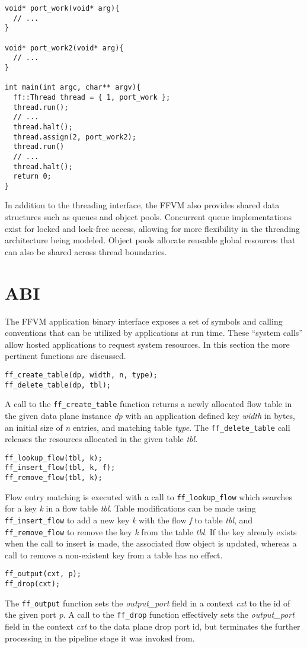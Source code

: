 \begin{lstlisting}
void* port_work(void* arg){
  // ...
}

void* port_work2(void* arg){
  // ...
}

int main(int argc, char** argv){
  ff::Thread thread = { 1, port_work };
  thread.run();
  // ...
  thread.halt();
  thread.assign(2, port_work2);
  thread.run()
  // ...
  thread.halt();
  return 0;
}
\end{lstlisting}

In addition to the threading interface, the FFVM also provides shared data
structures such as queues and object pools. Concurrent queue implementations
exist for locked and lock-free access, allowing for more flexibility in the
threading architecture being modeled. Object pools allocate reusable global
resources that can also be shared across thread boundaries.

\section{ABI}
\label{vm:abi}
The FFVM application binary interface exposes a set of symbols and calling
conventions that can be utilized by applications at run time. These ``system
calls'' allow hosted applications to request system resources. In this section
the more pertinent functions are discussed.

\begin{lstlisting}
ff_create_table(dp, width, n, type);
ff_delete_table(dp, tbl);
\end{lstlisting}

A call to the \texttt{ff\_create\_table} function returns a newly allocated
flow table in the given data plane instance \emph{dp} with an application
defined key \emph{width} in bytes, an initial size of \emph{n} entries, and
matching table \emph{type}. The \texttt{ff\_delete\_table} call releases the
resources allocated in the given table \emph{tbl}.

\begin{lstlisting}
ff_lookup_flow(tbl, k);
ff_insert_flow(tbl, k, f);
ff_remove_flow(tbl, k);
\end{lstlisting}

Flow entry matching is executed with a call to \texttt{ff\_lookup\_flow} which
searches for a key \emph{k} in a flow table \emph{tbl}. Table modifications can
be made using \texttt{ff\_insert\_flow} to add a new key \emph{k} with the
flow \emph{f} to table \emph{tbl}, and \texttt{ff\_remove\_flow} to remove the
key \emph{k} from the table \emph{tbl}. If the key already exists when the call
to insert is made, the associated flow object is updated, whereas a call to
remove a non-existent key from a table has no effect.

\begin{lstlisting}
ff_output(cxt, p);
ff_drop(cxt);
\end{lstlisting}

The \texttt{ff\_output} function sets the \emph{output\_port} field in a context
\emph{cxt} to the id of the given port \emph{p}. A call to the \texttt{ff\_drop}
function effectively sets the \emph{output\_port} field in the context \emph{cxt}
to the data plane drop port id, but terminates the further processing in the
pipeline stage it was invoked from.
